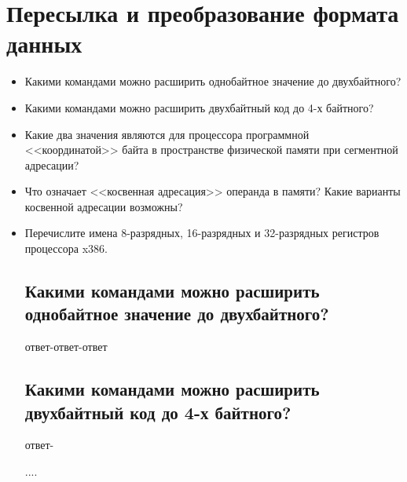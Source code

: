 \chapter{Пересылка и преобразование формата данных}
\begin{itemize}
\item Какими командами можно расширить однобайтное значение до двухбайтного?
\item Какими командами можно расширить двухбайтный код до 4-х байтного?
\item Какие два значения являются для процессора программной <<координатой>> байта в пространстве физической памяти при сегментной адресации?
\item Что означает <<косвенная адресация>> операнда в памяти? Какие варианты косвенной адресации возможны?
\item Перечислите имена 8-разрядных, 16-разрядных и 32-разрядных регистров процессора x386.

\section{Какими командами можно расширить однобайтное значение до двухбайтного?}

ответ-ответ-ответ

\section{Какими командами можно расширить двухбайтный код до 4-х байтного?}

ответ-

....

\end{itemize}
\endinput
